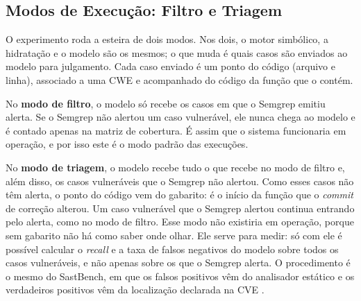\begin{figure}[htpb]
    \fonteautores
\end{figure}

\subsection{Modos de Execução: Filtro e Triagem}
\label{subsec:modos}
O experimento roda a esteira de dois modos. Nos dois, o motor simbólico, a hidratação e o modelo são os mesmos; o que muda é quais casos são enviados ao modelo para julgamento. Cada caso enviado é um ponto do código (arquivo e linha), associado a uma CWE e acompanhado do código da função que o contém.

No \textbf{modo de filtro}, o modelo só recebe os casos em que o Semgrep emitiu alerta. Se o Semgrep não alertou um caso vulnerável, ele nunca chega ao modelo e é contado apenas na matriz de cobertura. É assim que o sistema funcionaria em operação, e por isso este é o modo padrão das execuções.

No \textbf{modo de triagem}, o modelo recebe tudo o que recebe no modo de filtro e, além disso, os casos vulneráveis que o Semgrep não alertou. Como esses casos não têm alerta, o ponto do código vem do gabarito: é o início da função que o \textit{commit} de correção alterou. Um caso vulnerável que o Semgrep alertou continua entrando pelo alerta, como no modo de filtro. Esse modo não existiria em operação, porque sem gabarito não há como saber onde olhar. Ele serve para medir: só com ele é possível calcular o \textit{recall} e a taxa de falsos negativos do modelo sobre todos os casos vulneráveis, e não apenas sobre os que o Semgrep alerta. O procedimento é o mesmo do SastBench, em que os falsos positivos vêm do analisador estático e os verdadeiros positivos vêm da localização declarada na CVE \cite{feiglin2026sastbench}.

